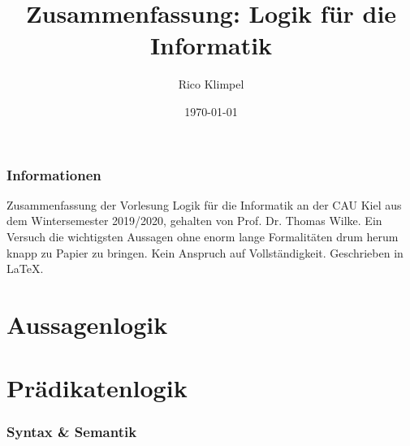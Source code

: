 \documentclass{article}
\title{Zusammenfassung: Logik für die Informatik }
\author{Rico Klimpel}
\date{\today}
\begin{document}
    \maketitle   
    \tableofcontents

    \setcounter{page}{1}

    \section*{Informationen}
    Zusammenfassung der Vorlesung Logik für die Informatik an der CAU Kiel aus dem Wintersemester 2019/2020, gehalten von Prof. Dr. Thomas Wilke. Ein Versuch die wichtigsten Aussagen ohne enorm lange Formalitäten drum herum knapp zu Papier zu bringen. Kein Anspruch auf Vollständigkeit. Geschrieben in \LaTeX.

    \clearpage

    \part{Aussagenlogik}
    

    \clearpage
    \part{Prädikatenlogik}

    \section{Syntax \& Semantik}
\end{document}
